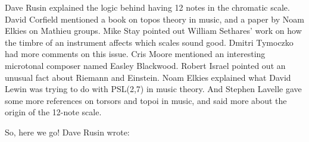 Dave Rusin explained the logic behind having 12 notes in the chromatic
scale.  David Corfield mentioned a book on topos theory in music, and
a paper by Noam Elkies on Mathieu groups.  Mike Stay pointed out William
Sethares' work on how the timbre of an instrument affects which scales
sound good.  Dmitri Tymoczko had more comments on this issue.  Cris Moore
mentioned an interesting microtonal composer named Easley Blackwood.
Robert Israel pointed out an unusual fact about Riemann and Einstein.
Noam Elkies explained what David Lewin was trying to do with PSL(2,7) in
music theory.  And Stephen Lavelle gave some more references on torsors
and topoi in music, and said more about the origin of the 12-note scale.

So, here we go!  Dave Rusin wrote:



